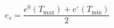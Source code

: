\documentclass[12pt]{article}
\begin{document}
\begin{displaymath}
e_{s}=\frac{e^{0}\left(T_{\max }\right)+e^{\circ}\left(T_{\min }\right)}{2}
\end{displaymath}
\end{document}
